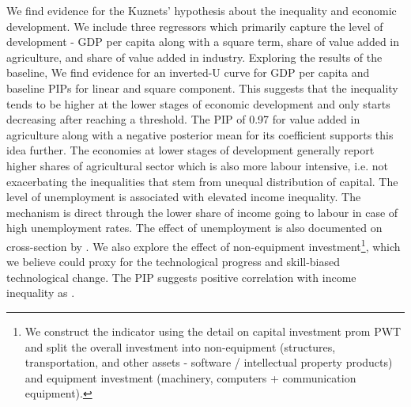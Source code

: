 \documentclass[preprint, nonatbib, 10pt]{elsarticle}
\begin{document}
We find evidence for the Kuznets' hypothesis about the inequality and economic development. We include three regressors which primarily capture the level of development - GDP per capita along with a square term, share of value added in agriculture, and share of value added in industry. Exploring the results of the baseline, We find evidence for an inverted-U curve for GDP per capita and baseline \acp{PIP} for linear and square component. This suggests that the inequality tends to be higher at the lower stages of economic development and only starts decreasing after reaching a threshold. The \ac{PIP} of 0.97 for value added in agriculture along with a negative posterior mean for its coefficient supports this idea further. The economies at lower stages of development generally report higher shares of agricultural sector which is also more labour intensive, i.e. not exacerbating the inequalities that stem from unequal distribution of capital. The level of unemployment is associated with elevated income inequality. The mechanism is direct through the lower share of income going to labour in case of high unemployment rates. The effect of unemployment is also documented on cross-section by \textcite{furceri2019robust}. We also explore the effect of non-equipment investment\footnote{We construct the indicator using the detail on capital investment prom \ac{PWT} and split the overall investment into non-equipment (structures, transportation, and other assets - software / intellectual property products) and equipment investment (machinery, computers + communication equipment).}, which we believe could proxy for the technological progress and skill-biased technological change. The \ac{PIP} suggests positive correlation with income inequality as \textcite{goldin2009race,dabla2015causes}.
\end{document}
